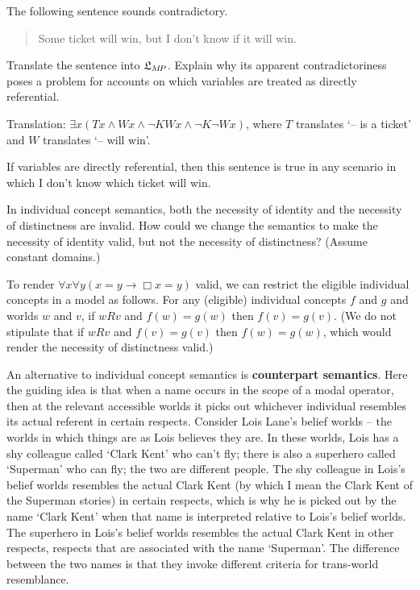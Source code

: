 \begin{exercise}
  The following sentence sounds contradictory.
  \begin{quote}
    Some ticket will win, but I don't know if it will win.
  \end{quote}
  Translate the sentence into $\mathfrak{L}_{M\!P}$. Explain why its apparent
  contradictoriness poses a problem for accounts on which variables are treated
  as directly referential.
\end{exercise}
\begin{solution}
  Translation: $\exists x (Tx \land Wx \land \neg K Wx \land \neg K \neg Wx)$,
  where $T$ translates `-- is a ticket' and $W$ translates `-- will win'.

  If variables are directly referential, then this sentence is true in any
  scenario in which I don't know which ticket will win.
\end{solution}

\begin{exercise}
  In individual concept semantics, both the necessity of identity and the
  necessity of distinctness are invalid. How could we change the semantics to
  make the necessity of identity valid, but not the necessity of distinctness?
  (Assume constant domains.)
\end{exercise}
\begin{solution}
  To render $\forall x \forall y (x\!=\!y \to \Box x\!=\!y)$ valid, we can
  restrict the eligible individual concepts in a model as follows. For any
  (eligible) individual concepts $f$ and $g$ and worlds $w$ and $v$, if $wRv$
  and $f(w)=g(w)$ then $f(v)=g(v)$. (We do not stipulate that if $wRv$ and
  $f(v)=g(v)$ then $f(w)=g(w)$, which would render the necessity of distinctness
  valid.)
\end{solution}


\iffalse

An alternative to individual concept semantics is \textbf{counterpart
  semantics}. Here the guiding idea is that when a name occurs in the scope of a
modal operator, then at the relevant accessible worlds it picks out whichever
individual resembles its actual referent in certain respects. Consider Lois
Lane's belief worlds -- the worlds in which things are as Lois believes they
are. In these worlds, Lois has a shy colleague called `Clark Kent' who can't
fly; there is also a superhero called `Superman' who can fly; the two are
different people. The shy colleague in Lois's belief worlds resembles the actual
Clark Kent (by which I mean the Clark Kent of the Superman stories) in certain
respects, which is why he is picked out by the name `Clark Kent' when that name
is interpreted relative to Lois's belief worlds. The superhero in Lois's belief
worlds resembles the actual Clark Kent in other respects, respects that are
associated with the name `Superman'. The difference between the two names is
that they invoke different criteria for trans-world resemblance.

